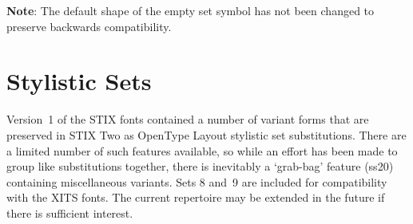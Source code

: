 \smallskip

\textbf{Note}: The default shape of the empty set symbol has not been
     changed to preserve backwards compatibility.

\section{Stylistic Sets}

Version~1 of the STIX fonts contained a number of variant forms that
are preserved in STIX Two as OpenType Layout stylistic set
substitutions.  There are a limited number of such features available,
so while an effort has been made to group like substitutions together,
there is inevitably a ‘grab-bag’ feature (ss20) containing
miscellaneous variants.  Sets 8 and~9 are included for compatibility
with the XITS fonts.  The current repertoire may be extended in the
future if there is sufficient interest.

\raggedcolumns

